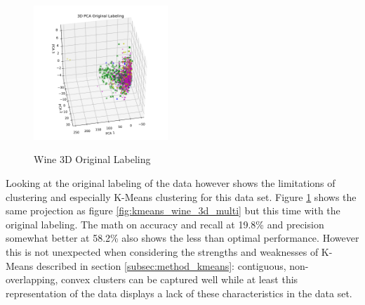 \vspace{-0.5cm}
\begin{figure}
  \centering
    \includegraphics[trim={1cm 0cm 1cm 1cm},width=0.45\textwidth, clip]{images/kmeans_wine_pca_original.pdf}
  \label{fig:kmeans_wine_pca_original}
  \caption{Wine 3D Original Labeling}
\end{figure}
Looking at the original labeling of the data however shows the limitations of clustering and especially K-Means clustering for this data set. Figure \ref{fig:kmeans_wine_pca_original} shows the same projection as figure \ref{fig:kmeans_wine_3d_multi} but this time with the original labeling. The math on accuracy and recall at 19.8\% and precision somewhat better at 58.2\% also shows the less than optimal performance. However this is not unexpected when considering the strengths and weaknesses of K-Means described in section \ref{subsec:method_kmeans}: contiguous, non-overlapping, convex clusters can be captured well while at least this representation of the data displays a lack of these characteristics in the data set.

